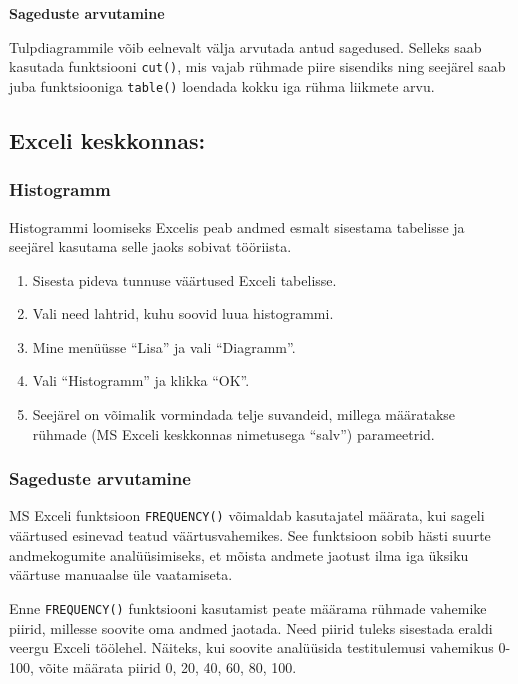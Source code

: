 \documentclass[
]{book}
\providecommand{\tightlist}{%
  \setlength{\itemsep}{0pt}\setlength{\parskip}{0pt}}
\theoremstyle{definition}
\theoremstyle{definition}
\theoremstyle{definition}
\theoremstyle{definition}
\theoremstyle{remark}
\begin{document}
\textbf{Sageduste arvutamine}

Tulpdiagrammile võib eelnevalt välja arvutada antud sagedused. Selleks saab kasutada funktsiooni \texttt{cut()}, mis vajab rühmade piire sisendiks ning seejärel saab juba funktsiooniga \texttt{table()} loendada kokku iga rühma liikmete arvu.

\subsection{Exceli keskkonnas:}\label{exceli-keskkonnas}

\subsubsection{Histogramm}\label{histogramm-1}

Histogrammi loomiseks Excelis peab andmed esmalt sisestama tabelisse ja seejärel kasutama selle jaoks sobivat tööriista.

\begin{enumerate}
\def\labelenumi{\arabic{enumi}.}
\tightlist
\item
  Sisesta pideva tunnuse väärtused Exceli tabelisse.
\item
  Vali need lahtrid, kuhu soovid luua histogrammi.
\item
  Mine menüüsse ``Lisa'' ja vali ``Diagramm''.
\item
  Vali ``Histogramm'' ja klikka ``OK''.
\item
  Seejärel on võimalik vormindada telje suvandeid, millega määratakse rühmade (MS Exceli keskkonnas nimetusega ``salv'') parameetrid.
\end{enumerate}

\subsubsection{Sageduste arvutamine}\label{sageduste-arvutamine}

MS Exceli funktsioon \texttt{FREQUENCY()} võimaldab kasutajatel määrata, kui sageli väärtused esinevad teatud väärtusvahemikes. See funktsioon sobib hästi suurte andmekogumite analüüsimiseks, et mõista andmete jaotust ilma iga üksiku väärtuse manuaalse üle vaatamiseta.

Enne \texttt{FREQUENCY()} funktsiooni kasutamist peate määrama rühmade vahemike piirid, millesse soovite oma andmed jaotada. Need piirid tuleks sisestada eraldi veergu Exceli töölehel. Näiteks, kui soovite analüüsida testitulemusi vahemikus 0-100, võite määrata piirid 0, 20, 40, 60, 80, 100.
\end{document}
